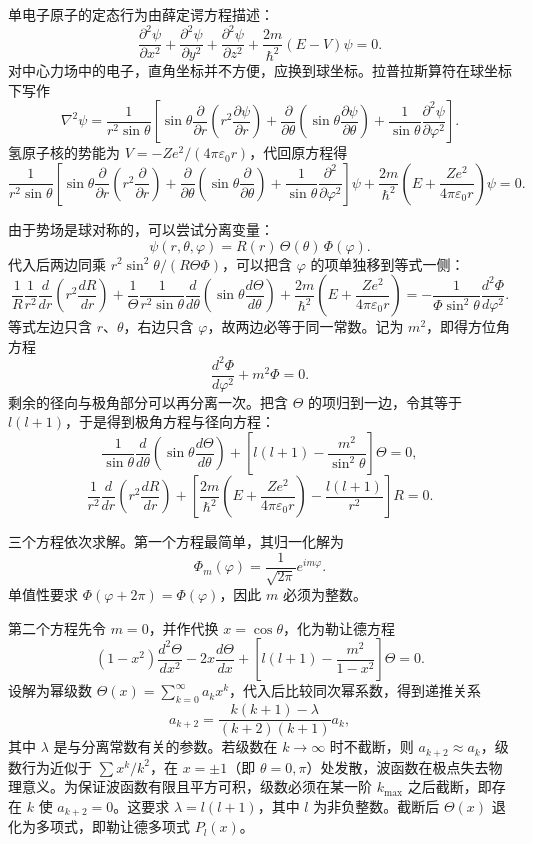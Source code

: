 \documentclass[UTF8]{ctexbook}
\begin{document}
单电子原子的定态行为由薛定谔方程描述：
\[
\frac{\partial^2\psi}{\partial x^2}
+\frac{\partial^2\psi}{\partial y^2}
+\frac{\partial^2\psi}{\partial z^2}
+\frac{2m}{\hbar^2}\left(E-V\right)\psi=0 .
\]
对中心力场中的电子，直角坐标并不方便，应换到球坐标。拉普拉斯算符在球坐标下写作
\[
\nabla^2\psi=\frac{1}{r^2\sin\theta}\left[
\sin\theta\frac{\partial}{\partial r}\left(r^2\frac{\partial\psi}{\partial r}\right)
+\frac{\partial}{\partial\theta}\left(\sin\theta\frac{\partial\psi}{\partial\theta}\right)
+\frac{1}{\sin\theta}\frac{\partial^2\psi}{\partial\varphi^2}\right].
\]
氢原子核的势能为 $V=-Ze^2/(4\pi\varepsilon_0r)$，代回原方程得
\[
\frac{1}{r^2\sin\theta}\left[
\sin\theta\frac{\partial}{\partial r}\left(r^2\frac{\partial}{\partial r}\right)
+\frac{\partial}{\partial\theta}\left(\sin\theta\frac{\partial}{\partial\theta}\right)
+\frac{1}{\sin\theta}\frac{\partial^2}{\partial\varphi^2}\right]\psi
+\frac{2m}{\hbar^2}\left(E+\frac{Ze^2}{4\pi\varepsilon_0r}\right)\psi=0 .
\]

由于势场是球对称的，可以尝试分离变量：
\[
\psi(r,\theta,\varphi)=R(r)\,\Theta(\theta)\,\Phi(\varphi).
\]
代入后两边同乘 $r^2\sin^2\theta/(R\Theta\Phi)$，可以把含 $\varphi$ 的项单独移到等式一侧：
\[
\frac{1}{R}\frac{1}{r^2}\frac{d}{dr}\left(r^2\frac{dR}{dr}\right)
+\frac{1}{\Theta}\frac{1}{r^2\sin\theta}\frac{d}{d\theta}\left(\sin\theta\frac{d\Theta}{d\theta}\right)
+\frac{2m}{\hbar^2}\left(E+\frac{Ze^2}{4\pi\varepsilon_0r}\right)
=-\frac{1}{\Phi\sin^2\theta}\frac{d^2\Phi}{d\varphi^2}.
\]
等式左边只含 $r$、$\theta$，右边只含 $\varphi$，故两边必等于同一常数。记为 $m^2$，即得方位角方程
\[
\frac{d^2\Phi}{d\varphi^2}+m^2\Phi=0 .
\]
剩余的径向与极角部分可以再分离一次。把含 $\Theta$ 的项归到一边，令其等于 $l(l+1)$，于是得到极角方程与径向方程：
\[
\frac{1}{\sin\theta}\frac{d}{d\theta}\left(\sin\theta\frac{d\Theta}{d\theta}\right)
+\left[l(l+1)-\frac{m^2}{\sin^2\theta}\right]\Theta=0,
\]
\[
\frac{1}{r^2}\frac{d}{dr}\left(r^2\frac{dR}{dr}\right)
+\left[\frac{2m}{\hbar^2}\left(E+\frac{Ze^2}{4\pi\varepsilon_0r}\right)-\frac{l(l+1)}{r^2}\right]R=0 .
\]

三个方程依次求解。第一个方程最简单，其归一化解为
\[
\Phi_m(\varphi)=\frac{1}{\sqrt{2\pi}}e^{im\varphi}.
\]
单值性要求 $\Phi(\varphi+2\pi)=\Phi(\varphi)$，因此 $m$ 必须为整数。

第二个方程先令 $m=0$，并作代换 $x=\cos\theta$，化为勒让德方程
\[
(1-x^2)\frac{d^2\Theta}{dx^2}-2x\frac{d\Theta}{dx}
+\left[l(l+1)-\frac{m^2}{1-x^2}\right]\Theta=0 .
\]
设解为幂级数 $\Theta(x)=\sum_{k=0}^{\infty}a_k x^k$，代入后比较同次幂系数，得到递推关系
\[
a_{k+2}=\frac{k(k+1)-\lambda}{(k+2)(k+1)}a_k,
\]
其中 $\lambda$ 是与分离常数有关的参数。若级数在 $k\to\infty$ 时不截断，则 $a_{k+2}\approx a_k$，级数行为近似于 $\sum x^k/k^2$，在 $x=\pm1$（即 $\theta=0,\pi$）处发散，波函数在极点失去物理意义。为保证波函数有限且平方可积，级数必须在某一阶 $k_{\max}$ 之后截断，即存在 $k$ 使 $a_{k+2}=0$。这要求 $\lambda=l(l+1)$，其中 $l$ 为非负整数。截断后 $\Theta(x)$ 退化为多项式，即勒让德多项式 $P_l(x)$。
\end{document}
